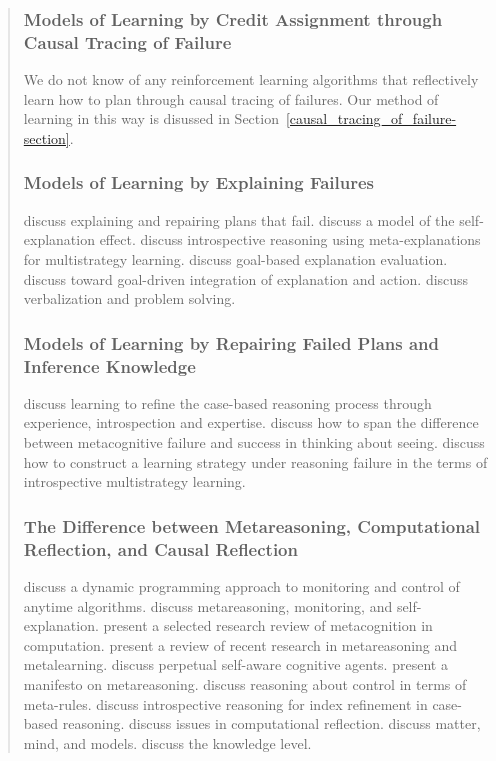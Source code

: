 \begin{quotation}
\subsubsection{Models of Learning by Credit Assignment through Causal Tracing of Failure}

We do not know of any reinforcement learning algorithms that reflectively learn how to plan through causal tracing of failures.
Our method of learning in this way is disussed in Section~\ref{causal_tracing_of_failure-section}.

\subsubsection{Models of Learning by Explaining Failures}

\cite{hammond1990ear} discuss explaining and repairing plans that fail.
\cite{vanlehn1992mse} discuss a model of the self-explanation effect.
\cite{ramcox1995irmeml} discuss introspective reasoning using meta-explanations for multistrategy learning.
\cite{leake1995gbee} discuss goal-based explanation evaluation.
\cite{leake1995tgdiea} discuss toward goal-driven integration of explanation and action.
\cite{dominowski1998vap} discuss verbalization and problem solving.

\subsubsection{Models of Learning by Repairing Failed Plans and Inference Knowledge}

\cite{DBLP:journals/jetai/Leake96} discuss learning to refine the case-based reasoning process through experience, introspection and expertise.
\cite{levin2004tss} discuss how to span the difference between metacognitive failure and success in thinking about seeing.
\cite{cox1996iml} discuss how to construct a learning strategy under reasoning failure in the terms of introspective multistrategy learning.

\subsubsection{The Difference between Metareasoning, Computational Reflection, and Causal Reflection}

\cite{hansen2001mac} discuss a dynamic programming approach to monitoring and control of anytime algorithms.
\cite{cox2007mma} discuss metareasoning, monitoring, and self-explanation.
\cite{cox2005mcs} present a selected research review of metacognition in computation.
\cite{anderson2007rrr} present a review of recent research in metareasoning and metalearning.
\cite{cox2007psa} discuss perpetual self-aware cognitive agents.
\cite{cox:mm} present a manifesto on metareasoning.
\cite{davis1980mrr} discuss reasoning about control in terms of meta-rules.
\cite{DBLP:journals/jetai/FoxL01} discuss introspective reasoning for index refinement in case-based reasoning.
\cite{maes1988icr} discuss issues in computational reflection.
\cite{minsky1968mmam} discuss matter, mind, and models.
\cite{DBLP:journals/ai/Newell82} discuss the knowledge level.


\end{quotation}
